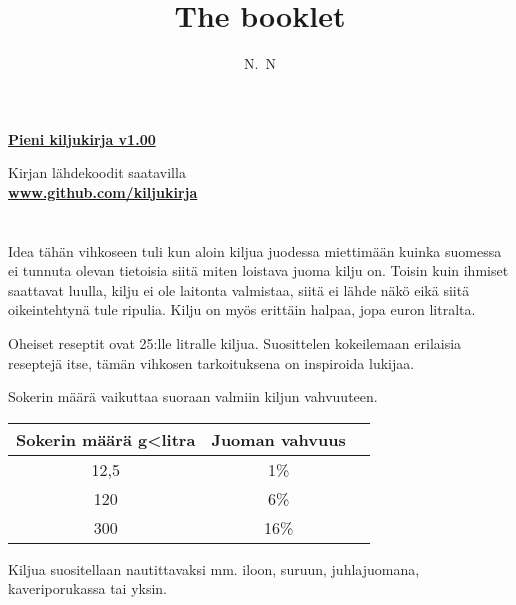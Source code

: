 \documentclass[20pt, a4]{article}
\author{N.~N}
\title{The booklet}
\begin{document}
\huge{

    \pagebreak

    \begin{center}
    \textbf{\underline{\Huge{Pieni kiljukirja v1.00}}}
    \vspace{180mm}

        Kirjan lähdekoodit saatavilla\\
        \Huge{\textbf{\underline{www.github.com/kiljukirja}}}
    \end{center}

    \pagebreak
    \section{}
    Idea tähän vihkoseen tuli kun aloin kiljua juodessa miettimään kuinka suomessa ei tunnuta olevan tietoisia siitä miten loistava juoma kilju on. Toisin kuin ihmiset saattavat luulla, kilju ei ole laitonta valmistaa, siitä ei lähde näkö eikä siitä oikeintehtynä tule ripulia. Kilju on myös erittäin halpaa, jopa euron litralta.

    Oheiset reseptit ovat 25:lle litralle kiljua. Suosittelen kokeilemaan erilaisia reseptejä itse, tämän vihkosen tarkoituksena on inspiroida lukijaa. 

    Sokerin määrä vaikuttaa suoraan valmiin kiljun vahvuuteen. 

    \begin{center}
    \begin{tabular}{ |c|c|c| } 
     \hline
     Sokerin määrä g<litra & Juoman vahvuus\\
     \hline
     12,5 & 1\% \\ 
     \hline
     120 & 6\% \\ 
     \hline
     300 & 16\% \\ 
     \hline
    \end{tabular}
    \end{center}

    Kiljua suositellaan nautittavaksi mm. iloon, suruun, juhlajuomana, kaveriporukassa tai yksin.

    \pagebreak
}
\end{document}
